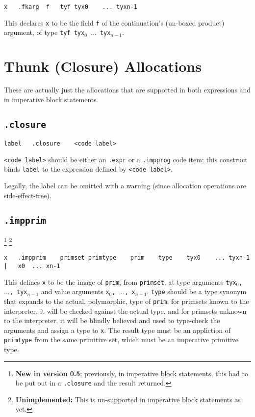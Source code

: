 \documentclass{report}
\newcommand\stringcode[1]{\texttt{#1}}
\newcommand\unimpl[1]{\footnote{\textbf{Unimplemented: }#1}}
\newcommand\new[2]{\footnote{\textbf{New in version #1}; previously, #2}}
\begin{document}
\begin{verbatim}
x	.fkarg	f	tyf	tyx0	...	tyxn-1
\end{verbatim}

This declares \stringcode{x} to be the field \stringcode{f} of the continuation's (un-boxed product) argument,
of type \stringcode{tyf tyx$_0$ $\ldots$ tyx$_{n-1}$}.

\section{Thunk (Closure) Allocations}
\label{thunk_alloc}

These are actually just the allocations that are supported in both expressions and in imperative block statements.

\subsection{\stringcode{.closure}}

\begin{verbatim}
label	.closure	<code label>
\end{verbatim}

\stringcode{<code label>} should be either an \stringcode{.expr} or a \stringcode{.impprog} code item;
this construct binds \stringcode{label} to the expression defined by \stringcode{<code label>}.

Legally, the label can be omitted with a warning (since allocation operations are side-effect-free).

\subsection{\stringcode{.impprim}}
\new{0.5}{in imperative block statements, this had to be put out in a \stringcode{.closure} and the result returned.}
\unimpl{This is un-supported in imperative block statements as yet.}

\begin{verbatim}
x	.impprim	primset	primtype	prim	type	tyx0	...	tyxn-1	|	x0	...	xn-1
\end{verbatim}

This defines \stringcode{x} to be the image of \stringcode{prim}, from \stringcode{primset},
at type arguments \stringcode{tyx$_0$, $\ldots$, tyx$_{n-1}$}
and value arguments \stringcode{x$_0$, $\ldots$, x$_{n-1}$}.
\stringcode{type} should be a type synonym that expands to the actual, polymorphic, type of \stringcode{prim};
for primsets known to the interpreter, it will be checked against the actual type,
and for primsets unknown to the interpreter,
it will be blindly believed and used to type-check the arguments and assign a type to \stringcode{x}.
The result type must be an appliction of \stringcode{primtype} from the same primitive set,
which must be an imperative primitive type.
\end{document}
